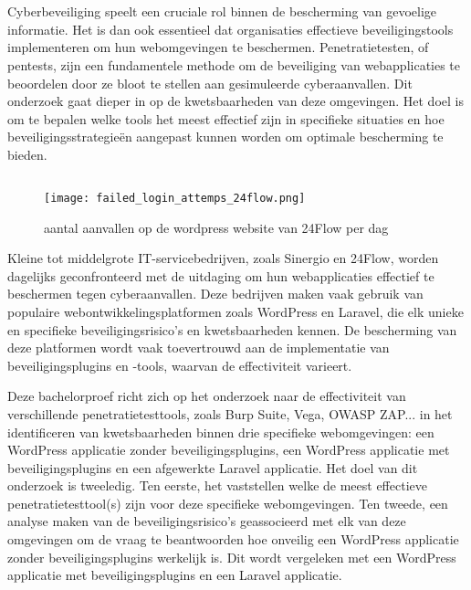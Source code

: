 
\chapter{}%
\label{ch:inleiding}
Cyberbeveiliging speelt een cruciale rol binnen de bescherming van gevoelige informatie. Het is dan ook essentieel dat organisaties 
effectieve beveiligingstools implementeren om hun webomgevingen te beschermen. Penetratietesten, of pentests, zijn een 
fundamentele methode om de beveiliging van webapplicaties te beoordelen door ze bloot te stellen aan gesimuleerde 
cyberaanvallen. Dit onderzoek gaat dieper in op de kwetsbaarheden van deze omgevingen. Het doel is om te bepalen welke tools 
het meest effectief zijn in specifieke situaties en hoe beveiligingsstrategieën aangepast kunnen worden om optimale 
bescherming te bieden.



\section{}%
\label{sec:probleemstelling}

\begin{figure}
  \centering
  \texttt{[image: failed\_login\_attemps\_24flow.png]}
  \caption[aantal aanvallen op de wordpress website van 24Flow per dag ]{aantal aanvallen op de wordpress website van 24Flow per dag }
\end{figure}
Kleine tot middelgrote IT-servicebedrijven, zoals Sinergio en 24Flow, worden dagelijks geconfronteerd met de uitdaging om hun 
webapplicaties effectief te beschermen tegen cyberaanvallen. Deze bedrijven maken vaak gebruik van populaire webontwikkelingsplatformen 
zoals WordPress en Laravel, die elk unieke en specifieke beveiligingsrisico's en kwetsbaarheden kennen. De bescherming van deze platformen 
wordt vaak toevertrouwd aan de implementatie van beveiligingsplugins en -tools, waarvan de effectiviteit varieert.

Deze bachelorproef richt zich op het onderzoek naar de effectiviteit van verschillende penetratietesttools, zoals Burp Suite, Vega, OWASP ZAP... 
in het identificeren van kwetsbaarheden binnen drie specifieke webomgevingen: een WordPress applicatie zonder beveiligingsplugins,
een WordPress applicatie met beveiligingsplugins en een afgewerkte Laravel applicatie. Het doel van dit onderzoek is tweeledig. 
Ten eerste, het vaststellen welke de meest effectieve penetratietesttool(s) zijn voor deze specifieke webomgevingen. Ten tweede, 
een analyse maken van de beveiligingsrisico's geassocieerd met elk van deze omgevingen om de vraag te beantwoorden hoe onveilig een 
WordPress applicatie zonder beveiligingsplugins werkelijk is. Dit wordt vergeleken met een WordPress applicatie met 
beveiligingsplugins en een Laravel applicatie.

